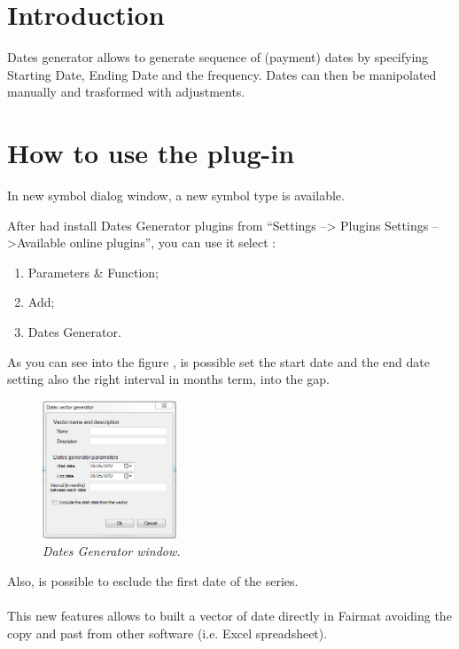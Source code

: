 \newcommand{\pluginName}{Dates Generator}
\newcommand{\pluginVersion}{1.0}




\section{Introduction}
Dates generator allows to generate sequence of (payment) dates by specifying Starting Date, Ending Date and the frequency.  Dates can then be manipolated manually and trasformed with adjustments.
\section{How to use the plug-in}
In new symbol dialog window, a new symbol type is available.

After had install Dates Generator plugins from ``Settings --> Plugins Settings 
-->Available online plugins'', you can use it select : 
\begin{enumerate}
\item Parameters \& Function;
\item Add;
\item Dates Generator.
\end{enumerate}
As you can see into the figure \label{fig:DG}, is possible set the start date and the end date setting also the right interval in months term, into the gap. 
\begin{figure}[h!]
\includegraphics[width=4cm]{DG_img}
\centering
\caption{\small{\emph{Dates Generator window.}}}
\label{fig:DG}
\end{figure}
Also, is possible to esclude the first date of the series.\\
\\
This new features allows to built a vector of date directly in Fairmat avoiding the 
copy and past from other software (i.e. Excel spreadsheet).




